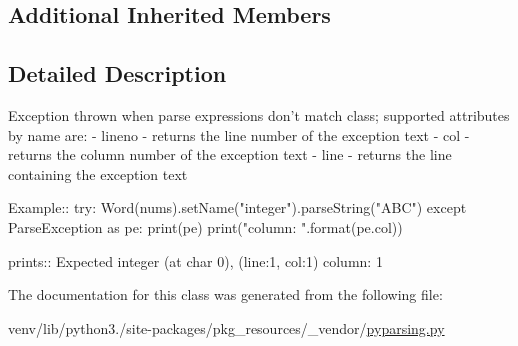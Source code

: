 \subsection*{Additional Inherited Members}


\subsection{Detailed Description}
\begin{DoxyVerb}Exception thrown when parse expressions don't match class;
supported attributes by name are:
 - lineno - returns the line number of the exception text
 - col - returns the column number of the exception text
 - line - returns the line containing the exception text
    
Example::
    try:
        Word(nums).setName("integer").parseString("ABC")
    except ParseException as pe:
        print(pe)
        print("column: {}".format(pe.col))
        
prints::
   Expected integer (at char 0), (line:1, col:1)
    column: 1
\end{DoxyVerb}
 

The documentation for this class was generated from the following file\+:\begin{DoxyCompactItemize}
\item 
venv/lib/python3./site-\/packages/pkg\+\_\+resources/\+\_\+vendor/\hyperlink{pkg__resources_2__vendor_2pyparsing_8py}{pyparsing.\+py}\end{DoxyCompactItemize}
